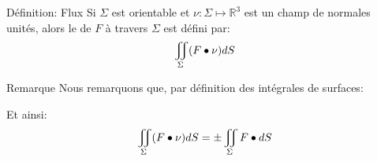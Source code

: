 \documentclass[a4paper]{article}
\begin{document}
\begin{parag}{Définition: Flux}
    Si $\Sigma$ est orientable et $\nu : \Sigma \mapsto \mathbb{R}^3$ est un champ de normales unités, alors le  de $F$ à travers $\Sigma$ est défini par: 
    \[\iint_\Sigma \left(F \dotprod \nu\right) dS\]

    \begin{subparag}{Remarque}
        Nous remarquons que, par définition des intégrales de surfaces:

        Et ainsi: 
        \[\iint_{\Sigma} \left(F \dotprod \nu\right)dS = \pm \iint_\Sigma F \dotprod dS\]
        
    \end{subparag}
\end{parag}
\end{document}
